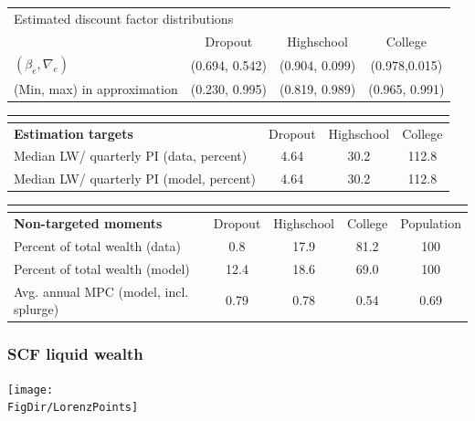 \documentclass[pdflatex,aspectratio=169]{beamer}
\begin{document}
\begin{frame}
\begin{tabular}{lccc}
	\multicolumn{4}{l}{Estimated discount factor distributions} \\ 
	& Dropout & Highschool & College \\ \midrule
	$(\beta_e, \nabla_e)$ & (0.694, 0.542) & (0.904, 0.099) & (0.978,0.015) \\
	(Min, max) in approximation & (0.230, 0.995) & (0.819, 0.989) & (0.965, 0.991) \\
	\midrule 
\end{tabular} 
\begin{tabular}{lccc}
	\multicolumn{4}{l}{ } \\ \midrule
	\textbf{Estimation targets} & Dropout & Highschool & College \\ \midrule
	Median LW/ quarterly PI (data, percent) & 4.64 & 30.2 & 112.8 \\ 
	Median LW/ quarterly PI (model, percent) & 4.64 & 30.2 & 112.8 %
	\\ \midrule 
\end{tabular} 
\begin{tabular}{lcccc}
	\multicolumn{5}{l}{ } \\ \midrule
	\textbf{Non-targeted moments} & Dropout & Highschool & College & Population \\ \midrule
	Percent of total wealth (data) & 0.8 & 17.9 & 81.2 & 100 \\
	Percent of total wealth (model) & 12.4 & 18.6 & 69.0 & 100 \\
	Avg. annual MPC (model, incl. splurge) & 0.79 & 0.78 & 0.54 & 0.69
	\\ \bottomrule 
\end{tabular}
\end{frame}




\begin{frame}
\frametitle{SCF liquid wealth}
\centering
\texttt{[image: \\FigDir/LorenzPoints]}
\end{frame}
\end{document}

